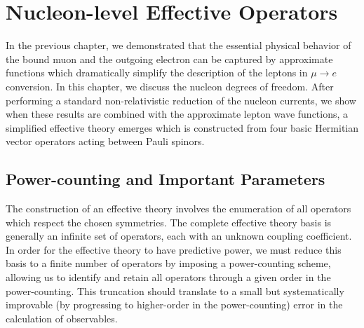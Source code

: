 \documentclass{book}[12pt]
\begin{document}
\chapter{Nucleon-level Effective Operators}
\label{chap:nucleon_level_eft}
In the previous chapter, we demonstrated that the essential physical behavior of the bound muon and the outgoing electron can be captured by approximate functions which dramatically simplify the description of the leptons in $\mu\rightarrow e$ conversion. In this chapter, we discuss the nucleon degrees of freedom. After performing a standard non-relativistic reduction of the nucleon currents, we show when these results are combined with the approximate lepton wave functions, a simplified effective theory emerges which is constructed from four basic Hermitian vector operators acting between Pauli spinors. 
\section{Power-counting and Important Parameters}
The construction of an effective theory involves the enumeration of all operators which respect the chosen symmetries. The complete effective theory basis is generally an infinite set of operators, each with an unknown coupling coefficient. In order for the effective theory to have predictive power, we must reduce this basis to a finite number of operators by imposing a power-counting scheme, allowing us to identify and retain all operators through a given order in the power-counting. This truncation should translate to a small but systematically improvable (by progressing to higher-order in the power-counting) error in the calculation of observables.
\end{document}
